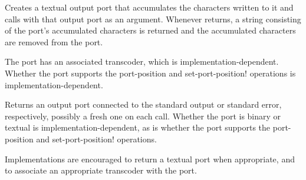 \begin{entry}{%
}

Creates a textual output port that accumulates the
characters written to it and calls  with that output port
as an argument. Whenever  returns, a string consisting of the
port's accumulated characters is returned and the accumulated characters are
removed from the port.

The port has an associated transcoder, which is implementation-dependent.
Whether the port supports
the {\cf port-position} and {\cf set-port-position!} operations
is implementation-dependent.
\end{entry}

\begin{entry}{%
}
   
Returns an output port connected to the standard output or standard error,
respectively, possibly a fresh one on each call.
Whether the port is binary or textual is implementation-dependent,
as is whether the port supports
the {\cf port-position} and {\cf set-port-position!} operations.

\begin{note}
  Implementations are encouraged to return a textual port when
  appropriate, and
  to associate an appropriate transcoder with the port.
\end{note}
\end{entry}

